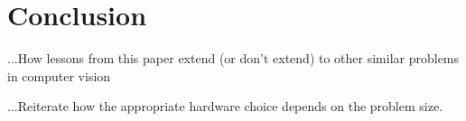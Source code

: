 \documentclass[10pt,twocolumn,letterpaper]{article}
\begin{document}




\section{Conclusion}
...How lessons from this paper extend (or don't extend) to other similar problems in computer vision

...Reiterate how the appropriate hardware choice depends on the problem size.



{\small


}
\end{document}
